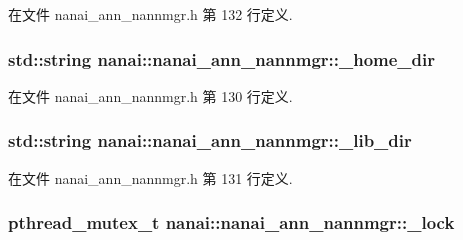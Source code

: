 在文件 nanai\+\_\+ann\+\_\+nannmgr.\+h 第 132 行定义.

\hypertarget{classnanai_1_1nanai__ann__nannmgr_a8305b13f05cfd2ec029dc325f0921609}{}
\subsubsection[{\+\_\+home\+\_\+dir}]{\setlength{\rightskip}{0pt plus 5cm}std\+::string nanai\+::nanai\+\_\+ann\+\_\+nannmgr\+::\+\_\+home\+\_\+dir\hspace{0.3cm}{\ttfamily [protected]}}\label{classnanai_1_1nanai__ann__nannmgr_a8305b13f05cfd2ec029dc325f0921609}


在文件 nanai\+\_\+ann\+\_\+nannmgr.\+h 第 130 行定义.

\hypertarget{classnanai_1_1nanai__ann__nannmgr_ac074b69306e1ff1a381fbcde3d66d75c}{}
\subsubsection[{\+\_\+lib\+\_\+dir}]{\setlength{\rightskip}{0pt plus 5cm}std\+::string nanai\+::nanai\+\_\+ann\+\_\+nannmgr\+::\+\_\+lib\+\_\+dir\hspace{0.3cm}{\ttfamily [protected]}}\label{classnanai_1_1nanai__ann__nannmgr_ac074b69306e1ff1a381fbcde3d66d75c}


在文件 nanai\+\_\+ann\+\_\+nannmgr.\+h 第 131 行定义.

\hypertarget{classnanai_1_1nanai__ann__nannmgr_a9c4963abd61f8aa52b372c01062b5b4d}{}
\subsubsection[{\+\_\+lock}]{\setlength{\rightskip}{0pt plus 5cm}pthread\+\_\+mutex\+\_\+t nanai\+::nanai\+\_\+ann\+\_\+nannmgr\+::\+\_\+lock\hspace{0.3cm}{\ttfamily [protected]}}\label{classnanai_1_1nanai__ann__nannmgr_a9c4963abd61f8aa52b372c01062b5b4d}


